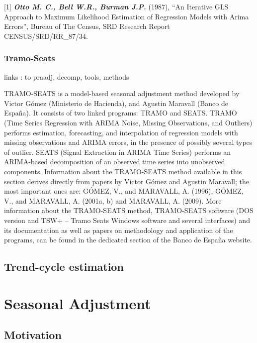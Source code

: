 \documentclass[
]{book}
\begin{document}
{[}1{]} \textbf{\emph{Otto M. C., Bell W.R., Burman J.P.}} (1987), ``An Iterative GLS Approach to Maximum Likelihood Estimation of Regression Models with Arima Errors'', Bureau of The Census, SRD Research Report CENSUS/SRD/RR\_87/34.

\hypertarget{tramo-seats}{%
\subsection{Tramo-Seats}\label{tramo-seats}}

links : to praadj, decomp, tools, methods

TRAMO-SEATS is a model-based seasonal adjustment method developed by
Victor Gómez (Ministerio de Hacienda), and Agustin Maravall (Banco de
España). It consists of two linked programs: TRAMO and SEATS. TRAMO
(Time Series Regression with ARIMA Noise, Missing Observations, and
Outliers) performs estimation, forecasting, and interpolation of
regression models with missing observations and ARIMA errors, in the
presence of possibly several types of outlier. SEATS (Signal
Extraction in ARIMA Time Series) performs an ARIMA-based decomposition
of an observed time series into unobserved components. Information about
the TRAMO-SEATS method available in this section derives directly from
papers by Victor Gómez and Agustin Maravall; the most important ones
are: GÓMEZ, V., and MARAVALL, A. (1996), GÓMEZ, V., and MARAVALL, A.
(2001a, b) and MARAVALL, A. (2009). More information about the
TRAMO-SEATS method, TRAMO-SEATS software (DOS version and TSW+ -- Tramo
Seats Windows software and several interfaces) and its documentation as
well as papers on methodology and application of the programs, can be
found in the dedicated section of the
Banco de España website.

\hypertarget{trend-cycle-estimation}{%
\section{Trend-cycle estimation}\label{trend-cycle-estimation}}

\hypertarget{seasonal-adjustment-1}{%
\chapter{Seasonal Adjustment}\label{seasonal-adjustment-1}}

\hypertarget{motivation}{%
\section{Motivation}\label{motivation}}
\end{document}
